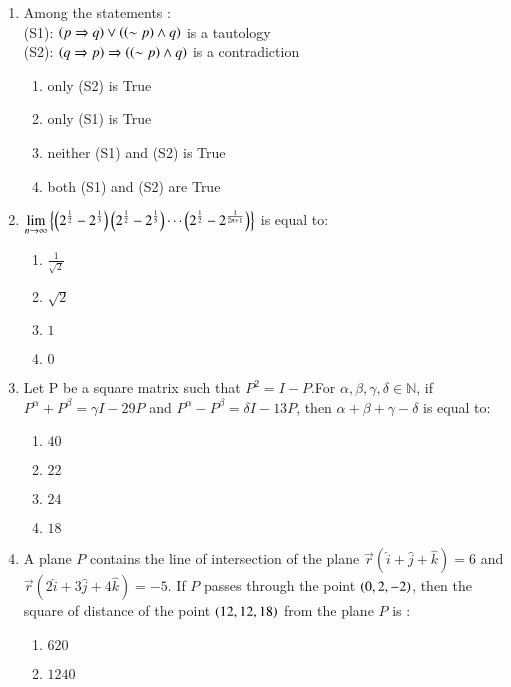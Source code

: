 \documentclass[journal,12pt,onecolumn]{IEEEtran}
\theoremstyle{remark}
\begin{document}
\begin{enumerate}
\item Among the statements : \\      
	(S1): $\left(p \Rightarrow q\right) \vee \left(\left(\sim p\right)\wedge q\right)$ is a tautology\\
		(S2): $\left(q \Rightarrow p\right) \Rightarrow \left(\left(\sim p\right)\wedge q\right)$ is a contradiction
    \begin{enumerate}
        \item only (S2) is True
        \item only (S1) is True
        \item neither (S1) and (S2) is True
        \item both (S1) and (S2) are True
    \end{enumerate}
    \item $\displaystyle \lim_{n \to \infty} \left\{ \left( 2^{\frac{1}{2}} -2^{\frac{1}{3}}\right) \left(2^{\frac{1}{2}} - 2^{\frac{1}{5}} \right) \cdots \left(2^{\frac{1}{2}} - 2^{\frac{1}{2n+1}}\right)\right\}$ is equal to:
    \begin{enumerate}
        \item $\frac{1}{\sqrt{2}}$
        \item $\sqrt{2}$
        \item $1$
        \item $0$
    \end{enumerate}
    \item Let P be a square matrix such that $P^2 = I-P$.For $\alpha , \beta, \gamma, \delta \in \mathbb{N}$, if  $P^{\alpha}+P^{\beta}=\gamma I-29 P$ and $P^{\alpha}-P^{\beta}=\delta I-13P$, then $\alpha +\beta+ \gamma-\delta$ is equal to: \begin{enumerate}
        \item $40$    
 \item $22$    
        \item $24$     
        \item $18$     
    \end{enumerate}    
   \item A plane $P$ contains the line of intersection of the plane $ \overrightarrow{r} ( \hat {i} + \hat{j} + \hat{k}) = 6$ and $\overrightarrow{r} (2\hat {i} + 3\hat{j} + 4\hat{k}) = -5 $. If  $P$ passes through the point  $\left(0, 2, -2\right)$, then the square of distance of the point $\left(12, 12, 18\right)$ from the plane $P$ is :
\begin{enumerate}
        \item $620$                   
        \item $1240$          

\end{enumerate}
\end{enumerate}
\end{document}
